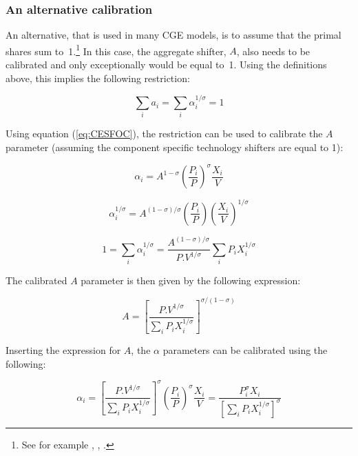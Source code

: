 \ifCESDetail

\subsubsection{An alternative calibration}

An alternative, that is used in many CGE models, is to assume that the primal shares sum
to~1.\footnote{See for example \cite{Devetal1997}, \cite{IFPRICGE2002}, \cite{Lofgrenetal2013}.}
In this case, the aggregate shifter, $A$, also needs to be calibrated and only exceptionally would
be equal to~1. Using the definitions above, this implies the following restriction:

\begin{displaymath}
\sum_i{a_i}=\sum\limits_{i}{\alpha _{i}^{1/\sigma }}=1
\end{displaymath}

Using equation (\ref{eq:CESFOC}), the restriction can be used to calibrate the $A$ parameter
(assuming the component specific technology shifters are equal to 1):

\begin{displaymath}
\alpha _{i}={{A}^{1-\sigma }}{{\left( \frac{{{P}_{i}}}{P} \right)}^{\sigma
}}\frac{{{X}_{i}}}{V}
\end{displaymath}

\begin{displaymath}
\alpha _{i}^{1/\sigma }={{A}^{(1-\sigma )/\sigma
}}\left( \frac{{{P}_{i}}}{P} \right){{\left( \frac{{{X}_{i}}}{V} \right)}^{1/\sigma
}}
\end{displaymath}

\begin{displaymath}
1=\sum\limits_{i}{\alpha _{i}^{1/\sigma }}=\frac{{{A}^{(1-\sigma
)/\sigma }}}{P.{{V}^{1/\sigma }}}\sum\limits_{i}{{{P}_{i}}X_{i}^{1/\sigma }}
\end{displaymath}

The calibrated $A$ parameter is then given by the following expression:

\begin{displaymath}
A={{\left[ \frac{P.{{V}^{1/\sigma }}}{\sum\limits_{i}{{{P}_{i}}X_{i}^{1/\sigma
}}} \right]}^{\sigma /(1-\sigma )}}
\end{displaymath}

Inserting the expression for $A$, the $\alpha$ parameters can be calibrated using the following:

\begin{displaymath}
{{\alpha }_{i}}={{\left[ \frac{P.{{V}^{1/\sigma
}}}{\sum\limits_{i}{{{P}_{i}}X_{i}^{1/\sigma }}} \right]}^{\sigma }}{{\left(
\frac{{{P}_{i}}}{P} \right)}^{\sigma }}\frac{{{X}_{i}}}{V}=\frac{P_{i}^{\sigma
}{{X}_{i}}}{{{\left[ \sum\limits_{i}{{{P}_{i}}X_{i}^{1/\sigma }} \right]}^{\sigma }}}
\end{displaymath}

